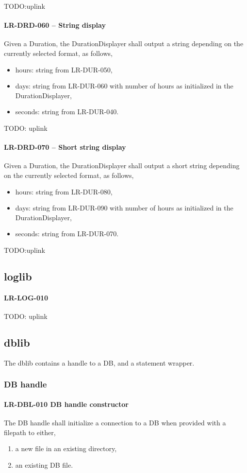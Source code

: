 TODO:uplink
\paragraph{LR-DRD-060 -- String display}
Given a Duration, the DurationDisplayer shall output a string depending
on the currently selected format, as follows,
\begin{itemize}
\item hours: string from LR-DUR-050,
\item days: string from LR-DUR-060 with number of hours as initialized in the
            DurationDisplayer,
\item seconds: string from LR-DUR-040.
\end{itemize}

TODO: uplink
\paragraph{LR-DRD-070 -- Short string display}
Given a Duration, the DurationDisplayer shall output a short string depending
on the currently selected format, as follows,
\begin{itemize}
\item hours: string from LR-DUR-080,
\item days: string from LR-DUR-090 with number of hours as initialized in the
            DurationDisplayer,
\item seconds: string from LR-DUR-070.
\end{itemize}

TODO:uplink
\subsection{log\textunderscore lib}
\paragraph{LR-LOG-010}
TODO: uplink

\subsection{db\textunderscore lib}
The db\textunderscore lib contains a handle to a \gls{DB}, and a statement
wrapper.

\subsubsection{DB handle}
\paragraph{LR-DBL-010 DB handle constructor}
The DB handle shall initialize a connection to a DB when provided
with a filepath to either,
\begin{enumerate}
\item a new file in an existing directory,
\item an existing DB file.
\end{enumerate}

